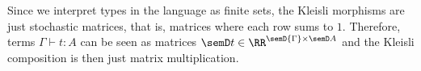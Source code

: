 Since we interpret types in the language as finite sets, the Kleisli morphisms are just stochastic matrices, that is, matrices where each row sums to $1$. Therefore, terms $\Gamma\vdash t:A$ can be seen as matrices
$  \semD t\in \RR^{\semD{\Gamma }\times \semD A}$
and the Kleisli composition is then just matrix multiplication.
